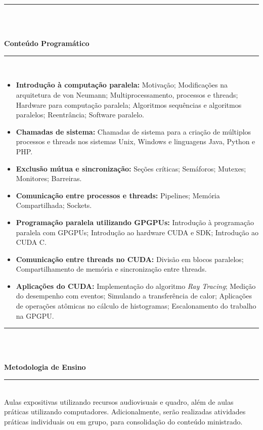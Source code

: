 \noindent\rule{16.5cm}{0.4pt}\\
\\
\vspace{-12mm}
\begin{center}\textbf{Conteúdo Programático}\end{center}
\vspace{-5mm}
\noindent\rule{16.5cm}{0.4pt}
\\
\begin{itemize}
 \item \textbf{Introdução à computação paralela:} Motivação; Modificações na arquitetura de von Neumann; Multiprocessamento, processos e threads; Hardware para computação paralela; Algoritmos sequências e algoritmos paralelos; Reentrância; Software paralelo.
 \item \textbf{Chamadas de sistema:} Chamadas de sistema para a criação de múltiplos processos e threads nos sistemas Unix, Windows e linguagens Java, Python e PHP.
 \item \textbf{Exclusão mútua e sincronização:} Seções críticas; Semáforos; Mutexes; Monitores; Barreiras.
 \item \textbf{Comunicação entre processos e threads:} Pipelines; Memória Compartilhada; Sockets.
 \item \textbf{Programação paralela utilizando GPGPUs:} Introdução à programação paralela com GPGPUs; Introdução ao hardware CUDA e SDK; Introdução ao CUDA C.
 \item \textbf{Comunicação entre threads no CUDA:} Divisão em blocos paralelos; Compartilhamento de memória e sincronização entre threads.
 \item \textbf{Aplicações do CUDA:} Implementação do algoritmo \textit{Ray Tracing}; Medição do desempenho com eventos; Simulando a transferência de calor; Aplicações de operações atômicas no cálculo de histogramas; Escalonamento do trabalho na GPGPU.
\end{itemize}
\noindent\rule{16.5cm}{0.4pt}\\
\\
\vspace{-12mm}
\begin{center}\textbf{Metodologia de Ensino}\end{center} 
\vspace{-5mm}
\noindent\rule{16.5cm}{0.4pt}
\\
    Aulas expositivas utilizando recursos audiovisuais e quadro, além de aulas práticas utilizando computadores. Adicionalmente, serão realizadas atividades práticas individuais ou em grupo, para consolidação do conteúdo ministrado.\\

